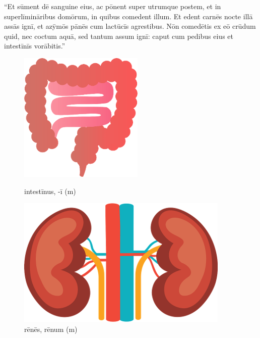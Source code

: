``Et sūment dē sanguine eius,
ac pōnent super utrumque postem, et in
superlīmināribus domōrum, in quibus comedent illum. Et edent carnēs nocte illā
assās ignī, et
azȳmōs pānēs cum lactūcīs agrestibus. Nōn
comedētis ex eō crūdum quid, nec coctum aquā, sed tantum
assum ignī: caput cum pedibus eius et intestīnīs
vorābitis.''

\begin{figure}[h!]
    \begin{minipage}[hp]{0.5\linewidth}
        \centering
        \includegraphics{intestine}
        \caption{intestīnus, -ī (m)}
    \end{minipage}%
    \begin{minipage}[hp]{0.5\linewidth}
        \centering
        \includegraphics{renes}
        \caption{rēnēs, rēnum (m)}
    \end{minipage}
\end{figure}

